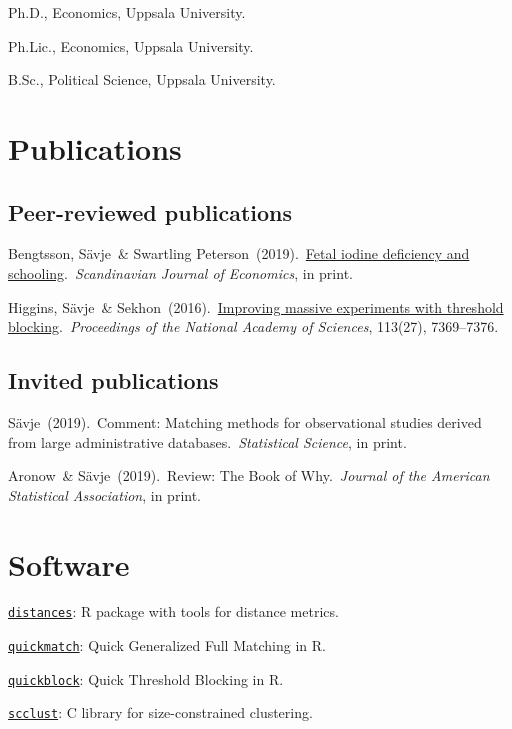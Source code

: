 \documentclass[10pt,letterpaper]{article}
\newenvironment{singledatelist}{
	\begin{list}{}{
		\setlength{\parskip}{0pt}
		\setlength{\itemsep}{4pt}
		\setlength{\parsep}{0.3em}
		\setlength{\leftmargin}{3.5em}
		\setlength{\labelwidth}{3.5em}
		\setlength{\labelsep}{1.5em}
		}
	}{
\end{list}
}
\newcommand{\dateitem}[2][]{\item[{#1}] {#2}}
\newenvironment{infolist}{
	\begin{list}{}{
		\setlength{\parskip}{0pt}
		\setlength{\itemsep}{4pt}
		\setlength{\parsep}{0.3em}
		\setlength{\leftmargin}{0em}
		\setlength{\labelwidth}{0em}
		}
	}{
\end{list}
}
\newcommand{\infoitem}[1]{\item {#1}}
\begin{document}
	\begin{singledatelist}
		\dateitem[2015]{Ph.D., Economics, Uppsala University.}
		\dateitem[2013]{Ph.Lic., Economics, Uppsala University.}
		\dateitem[2010]{B.Sc., Political Science, Uppsala University.}
	\end{singledatelist}


	\section*{Publications}

	\subsection*{Peer-reviewed publications}

	\begin{infolist}
		\infoitem{Bengtsson, Sävje\ \& Swartling Peterson\ (2019).\ \href{https://onlinelibrary.wiley.com/doi/abs/10.1111/sjoe.12341}{Fetal iodine deficiency and schooling}.\ \textit{Scandinavian Journal of Economics}, in print.}
		\infoitem{Higgins, Sävje\ \& Sekhon\ (2016).\ \href{https://www.pnas.org/content/113/27/7369}{Improving massive experiments with threshold blocking}.\ \textit{Proceedings of the National Academy of Sciences}, 113(27), 7369--7376.}
	\end{infolist}


	\subsection*{Invited publications}

	\begin{infolist}
		\infoitem{Sävje\ (2019).\ Comment: Matching methods for observational studies derived from large administrative databases.\ \textit{Statistical Science}, in print.}
		\infoitem{Aronow\ \& Sävje\ (2019).\ Review: The Book of Why.\ \textit{Journal of the American Statistical Association}, in print.}
	\end{infolist}


	\section*{Software}

	\begin{infolist}
		\infoitem{\href{https://github.com/fsavje/distances}{\texttt{distances}}: R package with tools for distance metrics.}
		\infoitem{\href{https://github.com/fsavje/quickmatch}{\texttt{quickmatch}}: Quick Generalized Full Matching in R.}
		\infoitem{\href{https://github.com/fsavje/quickblock}{\texttt{quickblock}}: Quick Threshold Blocking in R.}
		\infoitem{\href{https://github.com/fsavje/scclust}{\texttt{scclust}}: C library for size-constrained clustering.}
	\end{infolist}
\end{document}
